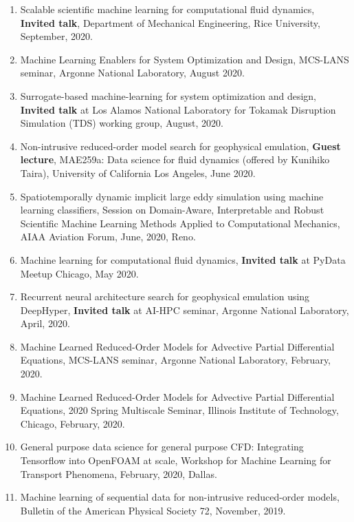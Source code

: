 \documentclass[letterpaper]{article}
\begin{document}
\begin{enumerate}
\item Scalable scientific machine learning for computational fluid dynamics, \textbf{Invited talk}, Department of Mechanical Engineering, Rice University, September, 2020.

\item Machine Learning Enablers for System Optimization and Design, MCS-LANS seminar, Argonne National Laboratory, August 2020.

\item Surrogate-based machine-learning for system optimization and design, \textbf{Invited talk} at Los Alamos National Laboratory for Tokamak Disruption Simulation (TDS) working group, August, 2020.

\item Non-intrusive reduced-order model search for geophysical emulation, \textbf{Guest lecture}, MAE259a: Data science for fluid dynamics (offered by Kunihiko Taira), University of California Los Angeles, June 2020.

\item Spatiotemporally dynamic implicit large eddy simulation using machine learning classifiers, Session on Domain-Aware, Interpretable and Robust Scientific Machine Learning Methods Applied to Computational Mechanics, AIAA Aviation Forum, June, 2020, Reno. 

\item Machine learning for computational fluid dynamics, \textbf{Invited talk} at PyData Meetup Chicago, May 2020.

\item Recurrent neural architecture search for geophysical emulation using DeepHyper, \textbf{Invited talk} at AI-HPC seminar, Argonne National Laboratory, April, 2020.

\item Machine Learned Reduced-Order Models for Advective Partial Differential Equations, MCS-LANS seminar, Argonne National Laboratory, February, 2020.

\item Machine Learned Reduced-Order Models for Advective Partial Differential Equations, 2020 Spring Multiscale Seminar, Illinois Institute of Technology, Chicago, February, 2020.

\item General purpose data science for general purpose CFD: Integrating Tensorflow into OpenFOAM at scale, Workshop for Machine Learning for Transport Phenomena, February, 2020, Dallas.

\item Machine learning of sequential data for non-intrusive reduced-order models, Bulletin of the American Physical Society 72, November, 2019.


\end{enumerate}
\end{document}
